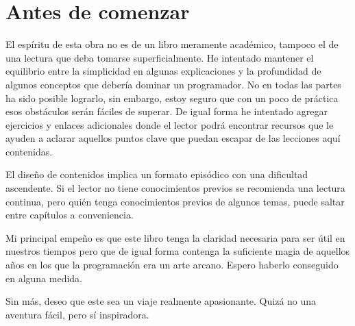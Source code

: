 \thispagestyle{empty}

\chapter{Antes de comenzar}


El espíritu de esta obra no es de un libro meramente académico, tampoco el de una lectura que deba tomarse superficialmente. He intentado mantener el equilibrio entre la simplicidad en algunas explicaciones y la profundidad de algunos conceptos que debería dominar un programador. No en todas las partes ha sido posible lograrlo, sin embargo, estoy seguro que con un poco de práctica esos obstáculos serán fáciles de superar. De igual forma he intentado agregar ejercicios y enlaces adicionales donde el lector podrá encontrar recursos que le ayuden a aclarar aquellos puntos clave que puedan escapar de las lecciones aquí contenidas.

El diseño de contenidos implica un formato episódico con una dificultad ascendente. Si el lector no tiene conocimientos previos se recomienda una lectura continua, pero quién tenga conocimientos previos de algunos temas, puede saltar entre capítulos a conveniencia.

Mi principal empeño es que este libro tenga la claridad necesaria para ser útil en nuestros tiempos pero que de igual forma contenga la suficiente magia de aquellos años en los que la programación era un arte arcano. Espero haberlo conseguido en alguna medida.

Sin más, deseo que este sea un viaje realmente apasionante. Quizá no una aventura fácil, pero sí inspiradora. 



